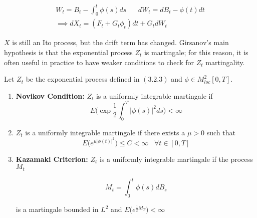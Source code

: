 \begin{gather*}
    W_t = B_t - \int_0^t \phi(s) ds \;\;\;\;\;\; dW_t = dB_t - \phi(t)dt \\
    \implies dX_t = (F_t+G_t \phi_t) dt + G_t dW_t
\end{gather*}

$X$ is still an Ito process, but the drift term has changed. Girsanov's main hypothesis is that the exponential process $Z_t$ is martingale; for this reason, it is often useful in practice to have weaker conditions to check for $Z_t$ martingality. 

\begin{proposition}
    Let $Z_t$ be the exponential process defined in $(3.2.3)$ and $\phi \in M^2_{loc}[0,T]$. 
    \begin{enumerate}
        \item \textbf{Novikov Condition:} $Z_t$ is a uniformly integrable martingale if
        \begin{equation}
            E\Bigg( \exp{\frac{1}{2} \int_0^T \vert \phi(s) \vert^2 ds} \Bigg) < \infty
        \end{equation}
        \item $Z_t$ is a uniformly integrable martingale if there exists a $\mu > 0$ such that 
        \begin{equation}
            E\Big( e^{\mu \vert \phi(t) \vert^2} \Big) \leq C < \infty \;\;\; \forall t \in [0,T]
        \end{equation}
        \item \textbf{Kazamaki Criterion:} $Z_t$ is a uniformly integrable martingale if the process $M_t$ 
        
        \begin{equation*}
            M_t = \int_0^t \phi(s) dB_s
        \end{equation*}
        
        
        is a martingale bounded in $L^2$ and $E\big( e^{\frac{1}{2}M_T}\big) < \infty$
        

    \end{enumerate}
\end{proposition}